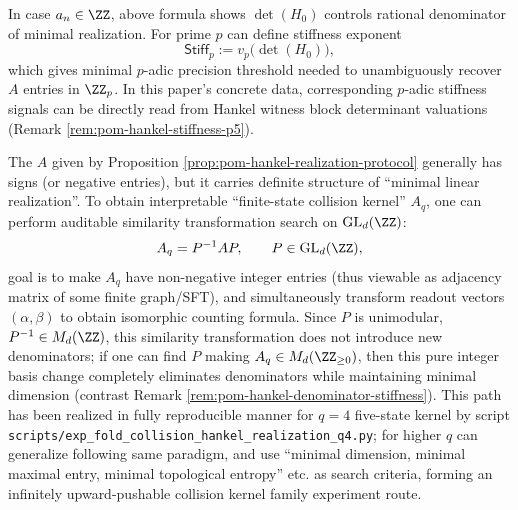 \begin{remark}\label{rem:pom-hankel-denominator-stiffness}
In case \(a_n\in\ZZ\), above formula shows \(\det(H_0)\) controls rational denominator of minimal realization.
For prime \(p\) can define stiffness exponent
\[
\mathsf{Stiff}_p:=v_p\!\bigl(\det(H_0)\bigr),
\]
which gives minimal \(p\)-adic precision threshold needed to unambiguously recover \(A\) entries in \(\ZZ_p\).
In this paper's concrete data, corresponding \(p\)-adic stiffness signals can be directly read from Hankel witness block determinant valuations (Remark \ref{rem:pom-hankel-stiffness-p5}).
\end{remark}

\begin{remark}\label{rem:pom-nonneg-kernel-search-protocol}
The \(A\) given by Proposition \ref{prop:pom-hankel-realization-protocol} generally has signs (or negative entries), but it carries definite structure of ``minimal linear realization''.
To obtain interpretable ``finite-state collision kernel'' \(A_q\), one can perform auditable similarity transformation search on \(\mathrm{GL}_d(\ZZ)\):
\[
A_q=P^{-1}AP,\qquad P\in\mathrm{GL}_d(\ZZ),
\]
goal is to make \(A_q\) have non-negative integer entries (thus viewable as adjacency matrix of some finite graph/SFT), and simultaneously transform readout vectors \((\alpha,\beta)\) to obtain isomorphic counting formula.
Since \(P\) is unimodular, \(P^{-1}\in M_d(\ZZ)\), this similarity transformation does not introduce new denominators; if one can find \(P\) making \(A_q\in M_d(\ZZ_{\ge 0})\), then this pure integer basis change completely eliminates denominators while maintaining minimal dimension (contrast Remark \ref{rem:pom-hankel-denominator-stiffness}).
This path has been realized in fully reproducible manner for \(q=4\) five-state kernel by script \texttt{scripts/exp\_fold\_collision\_hankel\_realization\_q4.py}; for higher \(q\) can generalize following same paradigm, and use ``minimal dimension, minimal maximal entry, minimal topological entropy'' etc. as search criteria, forming an infinitely upward-pushable collision kernel family experiment route.
\end{remark}

